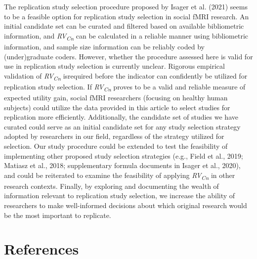 \documentclass[
  man,floatsintext]{apa6}
\begin{document}
The replication study selection procedure proposed by Isager et al. (2021) seems to be a feasible option for replication study selection in social fMRI research. An initial candidate set can be curated and filtered based on available bibliometric information, and \emph{RV\textsubscript{Cn}} can be calculated in a reliable manner using bibliometric information, and sample size information can be reliably coded by (under)graduate coders. However, whether the procedure assessed here is valid for use in replication study selection is currently unclear. Rigorous empirical validation of \emph{RV\textsubscript{Cn}} isrequired before the indicator can confidently be utilized for replication study selection. If \emph{RV\textsubscript{Cn}} proves to be a valid and reliable measure of expected utility gain, social fMRI researchers (focusing on healthy human subjects) could utilize the data provided in this article to select studies for replication more efficiently. Additionally, the candidate set of studies we have curated could serve as an initial candidate set for any study selection strategy adopted by researchers in our field, regardless of the strategy utilized for selection. Our study procedure could be extended to test the feasibility of implementing other proposed study selection strategies (e.g., Field et al., 2019; Matiasz et al., 2018; supplementary formula documents in Isager et al., 2020), and could be reiterated to examine the feasibility of applying \emph{RV\textsubscript{Cn}} in other research contexts. Finally, by exploring and documenting the wealth of information relevant to replication study selection, we increase the ability of researchers to make well-informed decisions about which original research would be the most important to replicate.

\hypertarget{references}{%
\section*{References}\label{references}}
\end{document}

